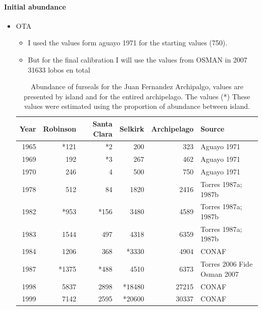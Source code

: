 \documentclass[11pt]{article}
\begin{document}
\paragraph*{Initial abundance}
\label{sec-5-2-1-1}
\begin{itemize}

\item OTA
\label{sec-5-2-1-1-1}%
\begin{itemize}
\item I used the values form aguayo 1971 for the starting values (750).
\item But for the final calibration I will use the values from OSMAN in 2007 31633 lobos en total
\end{itemize}
\begin{table}[htb]
\caption{Abundance of furseals for the Juan Fernandez Archipalgo,  values are presented by island and for the entired archipelago. The values (*) These values were estimated using the proportion of abundance between island.}
\begin{center}
\begin{tabular}{rrrrrl}
 Year  &  Robinson  &  Santa Clara  &  Selkirk  &  Archipelago  &  Source                       \\
\hline
 1965  &      *121  &           *2  &      200  &          323  &  Aguayo 1971                  \\
 1969  &       192  &           *3  &      267  &          462  &  Aguayo 1971                  \\
 1970  &       246  &            4  &      500  &          750  &  Aguayo 1971                  \\
 1978  &       512  &           84  &     1820  &         2416  &  Torres 1987a; 1987b          \\
 1982  &      *953  &         *156  &     3480  &         4589  &  Torres 1987a; 1987b          \\
 1983  &      1544  &          497  &     4318  &         6359  &  Torres 1987a; 1987b          \\
 1984  &      1206  &          368  &    *3330  &         4904  &  CONAF                        \\
 1987  &     *1375  &         *488  &     4510  &         6373  &  Torres 2006 Fide Osman 2007  \\
 1998  &      5837  &         2898  &   *18480  &        27215  &  CONAF                        \\
 1999  &      7142  &         2595  &   *20600  &        30337  &  CONAF                        \\

\end{tabular}
\end{center}
\end{table}
\end{itemize}
\end{document}
